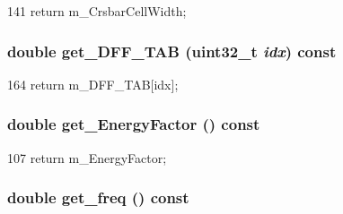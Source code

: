 \begin{DoxyCode}
141 { return m_CrsbarCellWidth; }
\end{DoxyCode}
\hypertarget{classTechParameter_a34320956a27f781250cce6ad992d01d9}{
\subsubsection[{get\_\-DFF\_\-TAB}]{\setlength{\rightskip}{0pt plus 5cm}double get\_\-DFF\_\-TAB ({\bf uint32\_\-t} {\em idx}) const}}
\label{classTechParameter_a34320956a27f781250cce6ad992d01d9}



\begin{DoxyCode}
164 { return m_DFF_TAB[idx]; }
\end{DoxyCode}
\hypertarget{classTechParameter_a57f2d419b08753b3e34e637950838b9a}{
\subsubsection[{get\_\-EnergyFactor}]{\setlength{\rightskip}{0pt plus 5cm}double get\_\-EnergyFactor () const}}
\label{classTechParameter_a57f2d419b08753b3e34e637950838b9a}



\begin{DoxyCode}
107 { return m_EnergyFactor; }
\end{DoxyCode}
\hypertarget{classTechParameter_aae98aa6884a276624d3ddd015f5a1825}{
\subsubsection[{get\_\-freq}]{\setlength{\rightskip}{0pt plus 5cm}double get\_\-freq () const}}
\label{classTechParameter_aae98aa6884a276624d3ddd015f5a1825}



